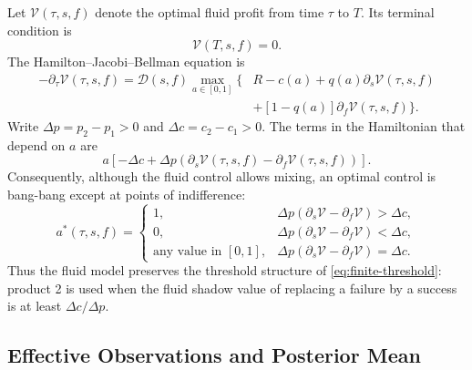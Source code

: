 \documentclass[opre]{informs3}
\begin{document}
Let $\mathcal{V}(\tau,s,f)$ denote the optimal fluid profit from time $\tau$ to
$T$. Its terminal condition is
\begin{equation}
    \mathcal{V}(T,s,f)=0.
    \label{eq:fluid-terminal}
\end{equation}
The Hamilton--Jacobi--Bellman equation is
\begin{equation}
\begin{aligned}
    -\partial_\tau\mathcal{V}(\tau,s,f)
    =
    \mathcal{D}(s,f)
    \max_{a\in[0,1]}
    \big\{
        &R-c(a)
        +q(a)\partial_s\mathcal{V}(\tau,s,f)\\
        &+[1-q(a)]\partial_f\mathcal{V}(\tau,s,f)
    \big\}.
\end{aligned}
\label{eq:fluid-hjb}
\end{equation}
Write $\Delta p=p_2-p_1>0$ and $\Delta c=c_2-c_1>0$. The terms in the
Hamiltonian that depend on $a$ are
\begin{equation}
    a\left[
        -\Delta c
        +\Delta p\left(
            \partial_s\mathcal{V}(\tau,s,f)
            -\partial_f\mathcal{V}(\tau,s,f)
        \right)
    \right].
    \label{eq:fluid-control-coefficient}
\end{equation}
Consequently, although the fluid control allows mixing, an optimal control is
bang-bang except at points of indifference:
\begin{equation}
    a^*(\tau,s,f)
    =
    \begin{cases}
        1,
        & \Delta p(\partial_s\mathcal{V}-\partial_f\mathcal{V})
          >\Delta c,\\
        0,
        & \Delta p(\partial_s\mathcal{V}-\partial_f\mathcal{V})
          <\Delta c,\\
        \text{any value in }[0,1],
        & \Delta p(\partial_s\mathcal{V}-\partial_f\mathcal{V})
          =\Delta c.
    \end{cases}
    \label{eq:fluid-bang-bang}
\end{equation}
Thus the fluid model preserves the threshold structure of
\cref{eq:finite-threshold}: product 2 is used when the fluid shadow value of
replacing a failure by a success is at least $\Delta c/\Delta p$.

\subsection{Effective Observations and Posterior Mean}
\end{document}
